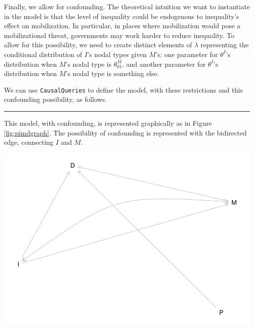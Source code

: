 \documentclass[
  12pt,
]{book}
\newenvironment{Shaded}{\begin{snugshade}}{\end{snugshade}}
\newcommand{\CommentTok}[1]{\textcolor[rgb]{0.56,0.35,0.01}{\textit{#1}}}
\newcommand{\DataTypeTok}[1]{\textcolor[rgb]{0.13,0.29,0.53}{#1}}
\newcommand{\KeywordTok}[1]{\textcolor[rgb]{0.13,0.29,0.53}{\textbf{#1}}}
\newcommand{\NormalTok}[1]{#1}
\newcommand{\OperatorTok}[1]{\textcolor[rgb]{0.81,0.36,0.00}{\textbf{#1}}}
\newcommand{\StringTok}[1]{\textcolor[rgb]{0.31,0.60,0.02}{#1}}
\begin{document}
Finally, we allow for confounding. The theoretical intuition we want to instantiate in the model is that the level of inequality could be endogenous to inequality's effect on mobilization. In particular, in places where mobilization would pose a mobilizational threat, governments may work harder to reduce inequality. To allow for this possibility, we need to create distinct elements of \(\lambda\) representing the conditional distribution of \(I\)'s nodal types given \(M\)'s: one parameter for \(\theta^I\)'s distribution when \(M\)'s nodal type is \(\theta^M_{01}\), and another parameter for \(\theta^I\)'s distribution when \(M\)'s nodal type is something else.

We can use \texttt{CausalQueries} to define the model, with these restrictions and this confounding possibility, as follows.

\begin{Shaded}
\end{Shaded}

\begin{center}\rule{0.5\linewidth}{0.5pt}\end{center}

This model, with confounding, is represented graphically as in Figure \ref{fig:pimdgraph}. The possibility of confounding is represented with the bidirected edge, connecting \(I\) and \(M\).

\includegraphics{ii_files/figure-latex/pimdgraph-1.pdf}
\end{document}
